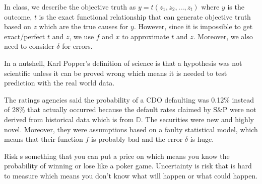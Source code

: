 \documentclass[12pt]{article}
\begin{document}
\begin{enumerate}
In class, we describe the objective truth as $y = t(z_1, z_2, \ldots, z_t)$ where $y$ is the outcome, $t$ is the exact functional relationship that can generate objective truth based on $z$ which are the true causes for $y$. However, since it is impossible to get exact/perfect $t$ and $z$, we use $f$ and $x$ to approximate $t$ and $z$. Moreover, we also need to consider $\delta$ for errors.



In a nutshell, Karl Popper's definition of science is that a hypothesis was not scientific unless it can be proved wrong which means it is needed to test prediction with the real world data.


The ratings agencies said the probability of a CDO defaulting was 0.12\% instead of 28\% that actually occurred because the default rates claimed by S\&P were not derived from historical data which is from $\mathbb{D}$. The securities were new and highly novel. Moreover, they were assumptions based on a faulty statistical model, which means that their function $f$ is probably bad and the error $\delta$ is huge.


Risk s something that you can put a price on which means you know the probability of winning or lose like a poker game. Uncertainty is risk that is hard to measure which means you don't know what will happen or what could happen.



\end{enumerate}
\end{document}
